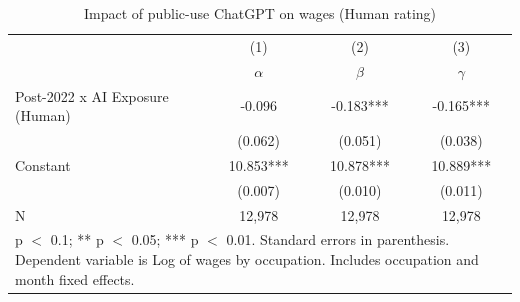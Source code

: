 \begin{table}[h]\centering
\def\sym#1{\ifmmode^{#1}\else\(^{#1}\)\fi}
\caption{Impact of public-use ChatGPT on wages (Human rating) \label{tab:did_wages_human}}
\begin{tabular}{l*{3}{c}}
\hline\hline
                    &\multicolumn{1}{c}{(1)}&\multicolumn{1}{c}{(2)}&\multicolumn{1}{c}{(3)}\\
                    &\multicolumn{1}{c}{$\alpha$}&\multicolumn{1}{c}{$\beta$}&\multicolumn{1}{c}{$\gamma$}\\
\hline
Post-2022 x AI Exposure (Human)&      -0.096   &      -0.183***&      -0.165***\\
                    &     (0.062)   &     (0.051)   &     (0.038)   \\
Constant            &      10.853***&      10.878***&      10.889***\\
                    &     (0.007)   &     (0.010)   &     (0.011)   \\
\hline
N                   &      12,978   &      12,978   &      12,978   \\
\hline\hline
\multicolumn{4}{p{0.7\linewidth}}{\footnotesize * p $<$ 0.1; ** p $<$ 0.05; *** p $<$ 0.01. Standard errors in parenthesis.          Dependent variable is Log of wages by occupation. Includes occupation and month fixed effects.}\\
\end{tabular}
\end{table}
